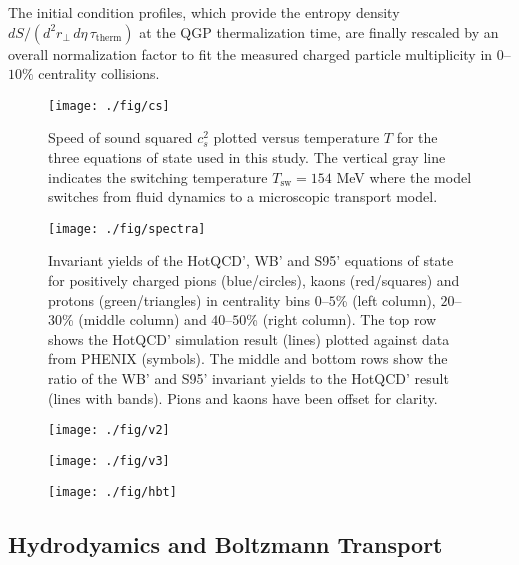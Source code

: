 \documentclass[aps,prc,reprint,amsmath,nofootinbib,superscriptaddress]{revtex4-1}
\begin{document}
The initial condition profiles, which provide the entropy density $dS/(d^2r_\perp\, d\eta\, \tau_\text{therm})$ at the QGP thermalization time, are finally 
rescaled by an overall normalization factor to fit the measured charged particle multiplicity in $0$--$10\%$ centrality collisions.

\begin{figure}
  \texttt{[image: ./fig/cs]}
  \caption{\label{fig:cs} Speed of sound squared $c_s^2$ plotted versus temperature $T$ for the three equations of state used in this study. The vertical
	   gray line indicates the switching temperature $T_\text{sw} = 154$ MeV where the model switches from fluid dynamics to a microscopic transport model.}
\end{figure}

\begin{figure*}[t]
  \texttt{[image: ./fig/spectra]}
  \caption{
    \label{fig:spectra} Invariant yields of the HotQCD', WB' and S95' equations of state for positively charged pions (blue/circles), kaons (red/squares) and 
    protons (green/triangles) in centrality bins $0$--$5$\% (left column), $20$--$30$\% (middle column) and $40$--$50$\% (right column). The top row shows the 
    HotQCD' simulation result (lines) plotted against data from PHENIX (symbols). The middle and bottom rows show the ratio of the WB' and S95' invariant yields 
    to the HotQCD' result (lines with bands). Pions and kaons have been offset for clarity.
  }
\end{figure*}

\begin{figure*}[t]
  \texttt{[image: ./fig/v2]}
  \caption{
    \label{fig:spectra}
  }
\end{figure*}

\begin{figure*}[t]
  \texttt{[image: ./fig/v3]}
  \caption{
    \label{fig:spectra}
  }
\end{figure*}

\begin{figure*}[t]
  \texttt{[image: ./fig/hbt]}
  \caption{
    \label{fig:spectra}
  }
\end{figure*}

\subsection{Hydrodyamics and Boltzmann Transport}
\end{document}
